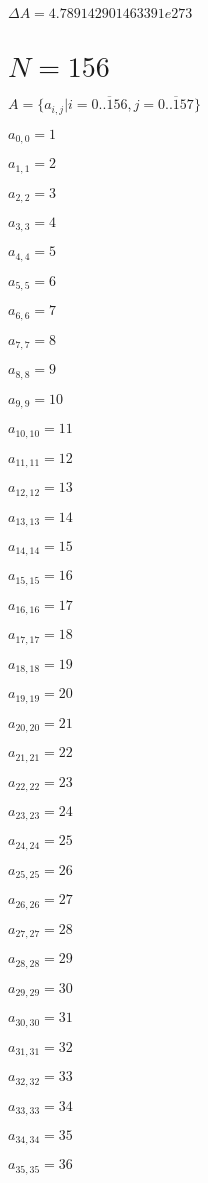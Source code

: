 \documentclass[a4paper,12pt]{article}
\begin{document}
$\Delta A = 4.789142901463391e273$



\section{ $N = 156$ }
$A = \{ a _{ i, j } | i = \overline { 0..156 }, j = \overline { 0..157 } \}$

$a _{ 0, 0 } = 1$

$a _{ 1, 1 } = 2$

$a _{ 2, 2 } = 3$

$a _{ 3, 3 } = 4$

$a _{ 4, 4 } = 5$

$a _{ 5, 5 } = 6$

$a _{ 6, 6 } = 7$

$a _{ 7, 7 } = 8$

$a _{ 8, 8 } = 9$

$a _{ 9, 9 } = 10$

$a _{ 10, 10 } = 11$

$a _{ 11, 11 } = 12$

$a _{ 12, 12 } = 13$

$a _{ 13, 13 } = 14$

$a _{ 14, 14 } = 15$

$a _{ 15, 15 } = 16$

$a _{ 16, 16 } = 17$

$a _{ 17, 17 } = 18$

$a _{ 18, 18 } = 19$

$a _{ 19, 19 } = 20$

$a _{ 20, 20 } = 21$

$a _{ 21, 21 } = 22$

$a _{ 22, 22 } = 23$

$a _{ 23, 23 } = 24$

$a _{ 24, 24 } = 25$

$a _{ 25, 25 } = 26$

$a _{ 26, 26 } = 27$

$a _{ 27, 27 } = 28$

$a _{ 28, 28 } = 29$

$a _{ 29, 29 } = 30$

$a _{ 30, 30 } = 31$

$a _{ 31, 31 } = 32$

$a _{ 32, 32 } = 33$

$a _{ 33, 33 } = 34$

$a _{ 34, 34 } = 35$

$a _{ 35, 35 } = 36$
\end{document}
